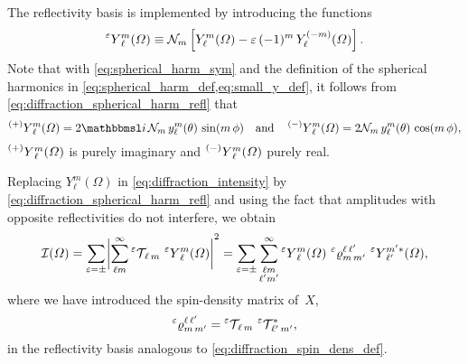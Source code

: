 The reflectivity basis is implemented by introducing the functions
\begin{equation}
  \label{eq:diffraction_spherical_harm_refl}
  \prescript{\refl}{}{Y}_\ell^m(\Omega)
  \equiv \mathcal{N}_m \sBrk[2]{Y_\ell^m(\Omega) - \refl\, (-1)^m\, Y_\ell^{(-m)}(\Omega)}.
\end{equation}
Note that with \cref{eq:spherical_harm_sym} and the definition of the
spherical harmonics in \cref{eq:spherical_harm_def,eq:small_y_def}, it
follows from \cref{eq:diffraction_spherical_harm_refl} that
\begin{equation}
  \prescript{(+)}{}{Y}_\ell^m(\Omega)
  = 2 \imag\, \mathcal{N}_m\, y_\ell^m(\theta)\, \sin(m\, \phi)
  \quad\text{and}\quad
  \prescript{(-)}{}{Y}_\ell^m(\Omega)
  = 2 \mathcal{N}_m\, y_\ell^m(\theta)\, \cos(m\, \phi),
\end{equation}
\ie $\prescript{(+)}{}{Y}_\ell^m(\Omega)$ is purely imaginary and
$\prescript{(-)}{}{Y}_\ell^m(\Omega)$ purely real.

Replacing $Y_\ell^m(\Omega)$ in \cref{eq:diffraction_intensity} by
\cref{eq:diffraction_spherical_harm_refl} and using the fact that
amplitudes with opposite reflectivities do not interfere, we obtain
\begin{equation}
  \label{eq:diffraction_intensity_refl}
  \intensity(\Omega)
  = \sum_{\refl = \pm} \Abs[3]{\sum_{\ell m}^\infty \prescript{\refl}{}{\prodAmp}_{\!\ell\, m}\, \prescript{\refl}{}{Y}_\ell^m(\Omega)}^2
  = \sum_{\refl = \pm} \sum_{\substack{\ell m \\ \ell' m'}}^\infty
  \prescript{\refl}{}{Y}_\ell^m(\Omega)\, \prescript{\refl}{}{\varrho}^{\ell\, \ell'}_{m\, m'}\, \prescript{\refl}{}{Y}_{\ell'}^{m' *}(\Omega),
\end{equation}
where we have introduced the spin-density matrix of~$X$,
\begin{equation}
  \label{eq:diffraction_refl_spin-dens}
  \prescript{\ensuremath{\varepsilon}}{}{\varrho}^{\ell\, \ell'}_{m\, m'}
  = \prescript{\ensuremath{\varepsilon}}{}{\ensuremath{\mathcal{T}}}_{\!\ell\, m}\, \prescript{\ensuremath{\varepsilon}}{}{\ensuremath{\mathcal{T}}}_{\!\ell'\, m'}^*,
\end{equation}
in the reflectivity basis analogous to
\cref{eq:diffraction_spin_dens_def}.

